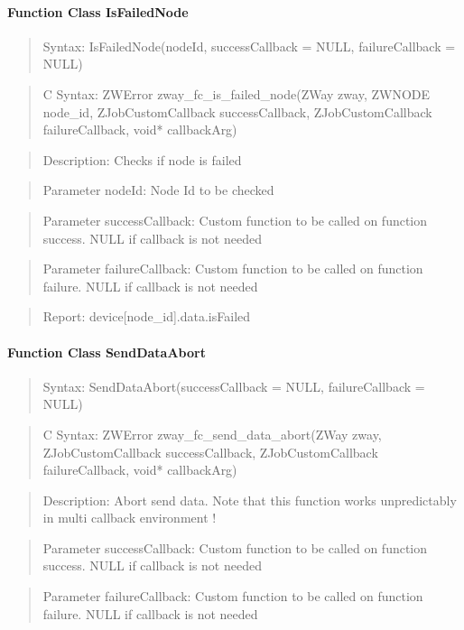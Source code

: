 \paragraph{Function Class IsFailedNode}
\begin{quote}Syntax: IsFailedNode(nodeId, successCallback = NULL, failureCallback = NULL)\end{quote}
\begin{quote}C Syntax: ZWError zway\_fc\_is\_failed\_node(ZWay zway, ZWNODE node\_id, ZJobCustomCallback successCallback, ZJobCustomCallback failureCallback, void* callbackArg)\end{quote}
\begin{quote}Description: Checks if node is failed\end{quote}
\begin{quote}Parameter nodeId: Node Id to be checked\end{quote}
\begin{quote}Parameter successCallback: Custom function to be called on function success. NULL if callback is not needed\end{quote}
\begin{quote}Parameter failureCallback: Custom function to be called on function failure. NULL if callback is not needed\end{quote}
\begin{quote}Report: device[node\_id].data.isFailed\end{quote}

\paragraph{Function Class SendDataAbort}
\begin{quote}Syntax: SendDataAbort(successCallback = NULL, failureCallback = NULL)\end{quote}
\begin{quote}C Syntax: ZWError zway\_fc\_send\_data\_abort(ZWay zway, ZJobCustomCallback successCallback, ZJobCustomCallback failureCallback, void* callbackArg)\end{quote}
\begin{quote}Description: Abort send data. Note that this function works unpredictably in multi callback environment !\end{quote}
\begin{quote}Parameter successCallback: Custom function to be called on function success. NULL if callback is not needed\end{quote}
\begin{quote}Parameter failureCallback: Custom function to be called on function failure. NULL if callback is not needed\end{quote}


